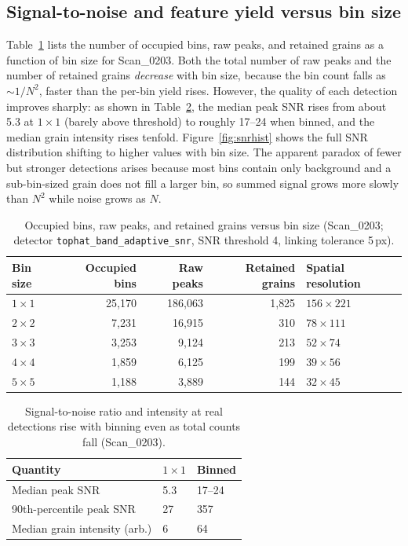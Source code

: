 \documentclass[12pt]{article}
\begin{document}
\subsection{Signal-to-noise and feature yield versus bin size}
Table~\ref{tab:counts} lists the number of occupied bins, raw peaks, and
retained grains as a function of bin size for Scan\_0203. Both the total number
of raw peaks and the number of retained grains \emph{decrease} with bin size,
because the bin count falls as $\sim1/N^2$, faster than the per-bin yield rises.
However, the quality of each detection improves sharply: as shown in
Table~\ref{tab:snr}, the median peak SNR rises from about 5.3 at $1\times1$
(barely above threshold) to roughly 17--24 when binned, and the median grain
intensity rises tenfold. Figure~\ref{fig:snrhist} shows the full SNR
distribution shifting to higher values with bin size. The apparent paradox of
fewer but stronger
detections arises because most bins contain only background and a
sub-bin-sized grain does not fill a larger bin, so summed signal grows more
slowly than $N^2$ while noise grows as $N$.

\begin{table}[H]
\centering
\caption{Occupied bins, raw peaks, and retained grains versus bin size
(Scan\_0203; detector \texttt{tophat\_band\_adaptive\_snr}, SNR threshold 4,
linking tolerance 5\,px).}
\label{tab:counts}
\small
\begin{tabular}{@{}lrrrl@{}}
\toprule
Bin size & Occupied bins & Raw peaks & Retained grains & Spatial resolution\\
\midrule
$1\times1$ & 25{,}170 & 186{,}063 & 1{,}825 & $156\times221$\\
$2\times2$ & 7{,}231  & 16{,}915  & 310   & $78\times111$\\
$3\times3$ & 3{,}253  & 9{,}124   & 213   & $52\times74$\\
$4\times4$ & 1{,}859  & 6{,}125   & 199   & $39\times56$\\
$5\times5$ & 1{,}188  & 3{,}889   & 144   & $32\times45$\\
\bottomrule
\end{tabular}
\end{table}

\begin{table}[H]
\centering
\caption{Signal-to-noise ratio and intensity at real detections rise with
binning even as total counts fall (Scan\_0203).}
\label{tab:snr}
\small
\begin{tabular}{@{}lll@{}}
\toprule
Quantity & $1\times1$ & Binned\\
\midrule
Median peak SNR & 5.3 & 17--24\\
90th-percentile peak SNR & 27 & 357\\
Median grain intensity (arb.) & 6 & 64\\
\bottomrule
\end{tabular}
\end{table}
\end{document}
